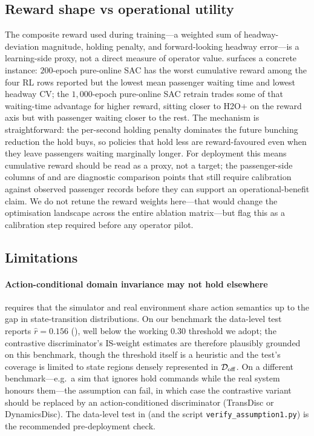 \subsection{Reward shape vs operational utility}
\label{sec:disc:operational}

The composite reward used during training---a weighted sum of headway-deviation magnitude, holding penalty, and forward-looking headway error---is a learning-side proxy, not a direct measure of operator value.
 surfaces a concrete instance: $200$-epoch pure-online SAC has the worst cumulative reward among the four RL rows reported but the lowest mean passenger waiting time and lowest headway CV; the $1{,}000$-epoch pure-online SAC retrain trades some of that waiting-time advantage for higher reward, sitting closer to H2O+ on the reward axis but with passenger waiting closer to the rest.
The mechanism is straightforward: the per-second holding penalty dominates the future bunching reduction the hold buys, so policies that hold less are reward-favoured even when they leave passengers waiting marginally longer.
For deployment this means cumulative reward should be read as a proxy, not a target; the passenger-side columns of  and  are diagnostic comparison points that still require calibration against observed passenger records before they can support an operational-benefit claim.
We do not retune the reward weights here---that would change the optimisation landscape across the entire ablation matrix---but flag this as a calibration step required before any operator pilot.

\subsection{Limitations}

\paragraph{Action-conditional domain invariance may not hold elsewhere}
 requires that the simulator and real environment share action semantics up to the gap in state-transition distributions.
On our benchmark the data-level test reports $\hat{r} = 0.156$ (), well below the working $0.30$ threshold we adopt; the contrastive discriminator's IS-weight estimates are therefore plausibly grounded on this benchmark, though the threshold itself is a heuristic and the test's coverage is limited to state regions densely represented in $\mathcal{D}_{\mathrm{off}}$.
On a different benchmark---e.g.\ a sim that ignores hold commands while the real system honours them---the assumption can fail, in which case the contrastive variant should be replaced by an action-conditioned discriminator (TransDisc or DynamicsDisc).
The data-level test in  (and the script \texttt{verify\_assumption1.py}) is the recommended pre-deployment check.

